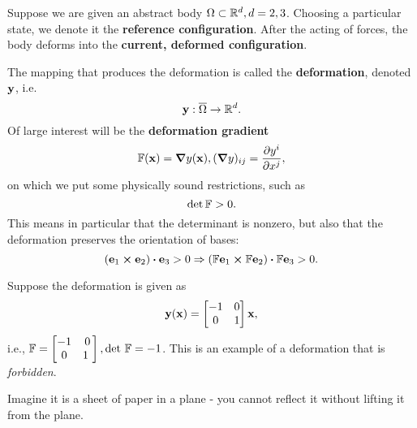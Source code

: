 \documentclass[11pt]{scrartcl} %
\begin{document}
Suppose we are given an abstract body $\Omega \subset {\mathbb R}^d, d=2,3$. Choosing a particular state, we denote it the \textbf{reference configuration}. After the acting of forces, the body deforms into the \textbf{current, deformed configuration}. 


The mapping that produces the deformation is called the \textbf{deformation}, denoted $\vb{y}$, i.e.
\[
	\vb{y}: \overline{\Omega} \to {\mathbb R}^d.
\]
Of large interest will be the \textbf{deformation gradient}
\[
	\mathbb{F}(\vb{x}) = \grad{y}(\vb{x}), (\grad{y})_{ij}=\pdv{y^i}{x^j},
\]
on which we put some physically sound restrictions, such as
\[
	\det \mathbb{F}> 0.
\]
This means in particular that the determinant is nonzero, but also that the deformation preserves the orientation of bases:
\[
(\vb{e}_1 \cross \vb{e}_2) \vdot \vb{e}_3 > 0 \Rightarrow(\fgrad\vb{e}_1 \cross \fgrad \vb{e}_2) \vdot \fgrad \vb{e}_3 >0.
\]

\begin{example}
	Suppose the deformation is given as
	\[
		\vb{y}(\vb{x}) = \begin{bmatrix}-1 & 0 \\ 0 & 1\end{bmatrix} \vb{x},
	\]
i.e., $\fgrad=\begin{bmatrix}-1 & 0 \\ 0 & 1\ \end{bmatrix}, \detf = -1$. This is an example of a deformation that is \textit{forbidden}.

\begin{center}
\end{center}


Imagine it is a sheet of paper in a plane - you cannot reflect it without lifting it from the plane.
\end{example}
\end{document}
